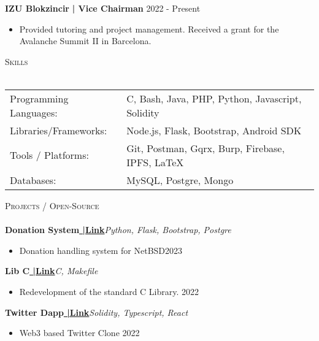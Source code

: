 \documentclass[a4paper]{article}
\newcommand{\lineunder} {
    \vspace*{-8pt} \\
    \hspace*{-18pt} \hrulefill \\
}
\newcommand{\header} [1] {
    {\hspace*{-18pt}\vspace*{6pt} \textsc{#1}}
    \vspace*{-6pt} \lineunder
}
\begin{document}
      \textbf{IZU Blokzincir}\textbf{ | Vice Chairman} \hfill 2022 - Present\\
     
          \vspace{-3mm}
\begin{itemize} \itemsep -3pt
\item[] Provided tutoring and project management. Received a grant for the Avalanche Summit II in Barcelona.
\end{itemize}

%
%
  \header{Skills}
  \vspace{2mm}
  \begin{longtable}{p{4cm}p{12cm}}
  Programming Languages: & C, Bash, Java, PHP, Python, Javascript, Solidity \\
  Libraries/Frameworks: & Node.js, Flask, Bootstrap, Android SDK  \\
  Tools / Platforms: & Git, Postman, Gqrx, Burp, Firebase, IPFS, \LaTeX \\
  Databases: & MySQL, Postgre, Mongo \\
  \end{longtable}
  \vspace{1mm}

      \header{Projects / Open-Source}
      \vspace{2mm}
      {\textbf{Donation System}}\textbf{\href{https://github.com/goeksu/NetBSD-Donation-Automation}{\scriptsize{ |Link}}}\hfill{\sl Python, Flask, Bootstrap, Postgre}\\
          \vspace{-3mm}
\begin{itemize} \itemsep -3pt
\item[] Donation handling system for NetBSD\hfill{2023}\\
\end{itemize}
          \vspace*{3mm}
       {\textbf{Lib C}}\textbf{\href{https://github.com/goeksu/libc}{\scriptsize{ |Link}}}\hfill{\sl C, Makefile}\\
          \vspace{-3mm}
\begin{itemize} \itemsep -3pt
\item[] Redevelopment of the standard C Library.  \hfill{2022}\\
\end{itemize}
          \vspace*{3mm}
      {\textbf{Twitter Dapp}}\textbf{\href{https://github.com/goeksu/Twitter-without-Elon-Dapp}{\scriptsize{ |Link}}}\hfill{\sl Solidity, Typescript, React}\\
          \vspace{-3mm}
\begin{itemize} \itemsep -3pt
\item[] Web3 based Twitter Clone \hfill{2022}\\
\end{itemize}
          \vspace*{3mm}
\end{document}
